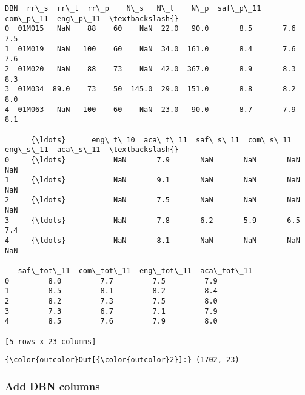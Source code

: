 \documentclass[11pt]{article}
\begin{document}
    \begin{Verbatim}[commandchars=\\\{\}]
      DBN  rr\_s  rr\_t  rr\_p    N\_s   N\_t    N\_p  saf\_p\_11  com\_p\_11  eng\_p\_11  \textbackslash{}
0  01M015   NaN    88    60    NaN  22.0   90.0       8.5       7.6       7.5   
1  01M019   NaN   100    60    NaN  34.0  161.0       8.4       7.6       7.6   
2  01M020   NaN    88    73    NaN  42.0  367.0       8.9       8.3       8.3   
3  01M034  89.0    73    50  145.0  29.0  151.0       8.8       8.2       8.0   
4  01M063   NaN   100    60    NaN  23.0   90.0       8.7       7.9       8.1   

      {\ldots}      eng\_t\_10  aca\_t\_11  saf\_s\_11  com\_s\_11  eng\_s\_11  aca\_s\_11  \textbackslash{}
0     {\ldots}           NaN       7.9       NaN       NaN       NaN       NaN   
1     {\ldots}           NaN       9.1       NaN       NaN       NaN       NaN   
2     {\ldots}           NaN       7.5       NaN       NaN       NaN       NaN   
3     {\ldots}           NaN       7.8       6.2       5.9       6.5       7.4   
4     {\ldots}           NaN       8.1       NaN       NaN       NaN       NaN   

   saf\_tot\_11  com\_tot\_11  eng\_tot\_11  aca\_tot\_11  
0         8.0         7.7         7.5         7.9  
1         8.5         8.1         8.2         8.4  
2         8.2         7.3         7.5         8.0  
3         7.3         6.7         7.1         7.9  
4         8.5         7.6         7.9         8.0  

[5 rows x 23 columns]

    \end{Verbatim}

\begin{Verbatim}[commandchars=\\\{\}]
{\color{outcolor}Out[{\color{outcolor}2}]:} (1702, 23)
\end{Verbatim}
            
    \subsubsection{Add DBN columns}\label{add-dbn-columns}
\end{document}
